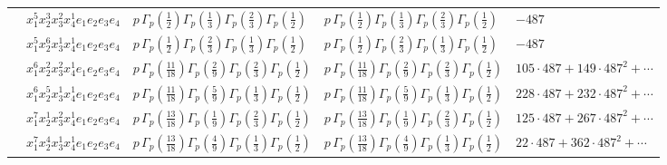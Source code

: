 \documentclass[11pt]{article}
\begin{document}
\begin{table}[ht]
{\begin{tabular}{@{}lllll@{}}
 & $x_{1}^{5} x_{2}^{3} x_{3}^{2} x_{4}^{1}  e_{1} e_{2} e_{3} e_{4}$ & $p \, \Gamma_p \left( \frac{1}{2} \right) \Gamma_p \left( \frac{1}{3} \right) \Gamma_p \left( \frac{2}{3} \right) \Gamma_p \left( \frac{1}{2} \right)$ & $p \, \Gamma_p \left( \frac{1}{2} \right) \Gamma_p \left( \frac{1}{3} \right) \Gamma_p \left( \frac{2}{3} \right) \Gamma_p \left( \frac{1}{2} \right)$ & $-487$ \\
 & $x_{1}^{5} x_{2}^{6} x_{3}^{1} x_{4}^{1}  e_{1} e_{2} e_{3} e_{4}$ & $p \, \Gamma_p \left( \frac{1}{2} \right) \Gamma_p \left( \frac{2}{3} \right) \Gamma_p \left( \frac{1}{3} \right) \Gamma_p \left( \frac{1}{2} \right)$ & $p \, \Gamma_p \left( \frac{1}{2} \right) \Gamma_p \left( \frac{2}{3} \right) \Gamma_p \left( \frac{1}{3} \right) \Gamma_p \left( \frac{1}{2} \right)$ & $-487$ \\
 & $x_{1}^{6} x_{2}^{2} x_{3}^{2} x_{4}^{1}  e_{1} e_{2} e_{3} e_{4}$ & $p \, \Gamma_p \left( \frac{11}{18} \right) \Gamma_p \left( \frac{2}{9} \right) \Gamma_p \left( \frac{2}{3} \right) \Gamma_p \left( \frac{1}{2} \right)$ & $p \, \Gamma_p \left( \frac{11}{18} \right) \Gamma_p \left( \frac{2}{9} \right) \Gamma_p \left( \frac{2}{3} \right) \Gamma_p \left( \frac{1}{2} \right)$ & $105{\cdot}487{+}149{\cdot}487^{2}{+}\cdots$ \\
 & $x_{1}^{6} x_{2}^{5} x_{3}^{1} x_{4}^{1}  e_{1} e_{2} e_{3} e_{4}$ & $p \, \Gamma_p \left( \frac{11}{18} \right) \Gamma_p \left( \frac{5}{9} \right) \Gamma_p \left( \frac{1}{3} \right) \Gamma_p \left( \frac{1}{2} \right)$ & $p \, \Gamma_p \left( \frac{11}{18} \right) \Gamma_p \left( \frac{5}{9} \right) \Gamma_p \left( \frac{1}{3} \right) \Gamma_p \left( \frac{1}{2} \right)$ & $228{\cdot}487{+}232{\cdot}487^{2}{+}\cdots$ \\
 & $x_{1}^{7} x_{2}^{1} x_{3}^{2} x_{4}^{1}  e_{1} e_{2} e_{3} e_{4}$ & $p \, \Gamma_p \left( \frac{13}{18} \right) \Gamma_p \left( \frac{1}{9} \right) \Gamma_p \left( \frac{2}{3} \right) \Gamma_p \left( \frac{1}{2} \right)$ & $p \, \Gamma_p \left( \frac{13}{18} \right) \Gamma_p \left( \frac{1}{9} \right) \Gamma_p \left( \frac{2}{3} \right) \Gamma_p \left( \frac{1}{2} \right)$ & $125{\cdot}487{+}267{\cdot}487^{2}{+}\cdots$ \\
 & $x_{1}^{7} x_{2}^{4} x_{3}^{1} x_{4}^{1}  e_{1} e_{2} e_{3} e_{4}$ & $p \, \Gamma_p \left( \frac{13}{18} \right) \Gamma_p \left( \frac{4}{9} \right) \Gamma_p \left( \frac{1}{3} \right) \Gamma_p \left( \frac{1}{2} \right)$ & $p \, \Gamma_p \left( \frac{13}{18} \right) \Gamma_p \left( \frac{4}{9} \right) \Gamma_p \left( \frac{1}{3} \right) \Gamma_p \left( \frac{1}{2} \right)$ & $22{\cdot}487{+}362{\cdot}487^{2}{+}\cdots$ \\

\end{tabular}}
\end{table}
\end{document}

